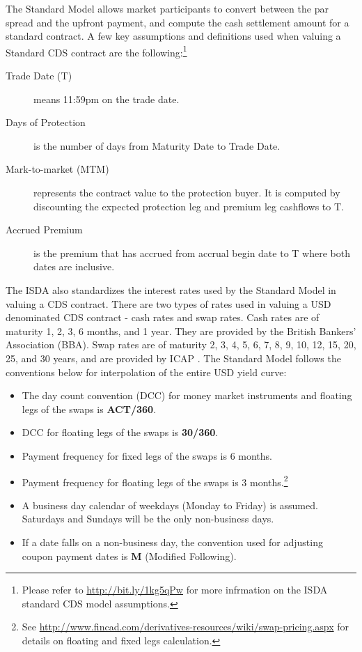 \documentclass[a4paper]{article}
\begin{document}
The Standard Model allows market participants to convert between
the par spread and the upfront payment, and compute the cash
settlement amount for a standard contract. A few key assumptions and
definitions used when valuing a Standard CDS contract are the
following:\footnote{Please refer to \url{http://bit.ly/1kg5qPw} for
  more infrmation on the ISDA standard CDS model assumptions.}


\begin{description}
\item[Trade Date (T)] means 11:59pm on the trade date.
\item[Days of Protection] is the number of days
  from Maturity Date to Trade Date.
\item[Mark-to-market (MTM)] represents the contract value to the
  protection buyer. It is computed by discounting the expected
  protection leg and premium leg cashflows to T.
\item[Accrued Premium] is the premium that has accrued from accrual
  begin date to T where both dates are inclusive.
\end{description}


The ISDA also standardizes the interest rates used by the Standard
Model in valuing a CDS contract. There are two types of rates used in
valuing a USD denominated CDS contract - cash rates and swap
rates. Cash rates are of maturity 1, 2, 3, 6 months, and 1 year. They
are provided by the British Bankers' Association (BBA). Swap rates are
of maturity 2, 3, 4, 5, 6, 7, 8, 9, 10, 12, 15, 20, 25, and 30 years,
and are provided by ICAP \citep{rates}. The Standard Model follows the
conventions below for interpolation of the entire USD yield curve:
\begin{itemize}
\item The day count convention (DCC) for money market instruments and
  floating legs of the swaps is \textbf{ACT/360}.
\item DCC for floating legs of the swaps is \textbf{30/360}.
\item Payment frequency for fixed legs of the swaps is 6 months.
\item Payment frequency for floating legs of the swaps is 3
  months.\footnote{See
    \url{http://www.fincad.com/derivatives-resources/wiki/swap-pricing.aspx}
    for details on floating and fixed legs calculation.}
\item A business day calendar of weekdays (Monday to Friday) is
  assumed. Saturdays and Sundays will be the only non-business days.
\item If a date falls on a non-business day, the convention used for
  adjusting coupon payment dates is \textbf{M} (Modified Following).
\end{itemize}
\end{document}
